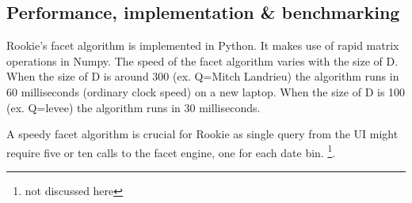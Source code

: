 \documentclass{article}
\begin{document}
\subsection{Performance, implementation \& benchmarking}

Rookie's facet algorithm is implemented in Python. It makes use of rapid matrix operations in Numpy. The speed of the facet algorithm varies with the size of D. When the size of D is around 300 (ex. Q=Mitch Landrieu) the algorithm runs in 60 milliseconds (ordinary clock speed) on a new laptop. When the size of D is 100 (ex. Q=levee) the algorithm runs in 30 milliseconds. 

A speedy facet algorithm is crucial for Rookie as single query from the UI might require five or ten calls to the facet engine, one for each date bin. \footnote{not discussed here}.
\end{document}
